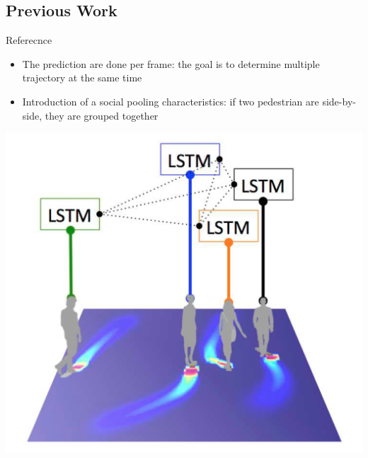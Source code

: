 \documentclass[a0,portrait]{a0poster}
\begin{document}
\begin{multicols}{2}
\section*{Previous Work}
Referecnce\\
\begin{minipage}[]{0.5\linewidth}
\begin{itemize}
\justifying
\item The prediction are done per frame: the goal is to determine multiple trajectory at the same time
\item Introduction of a social pooling characteristics: if two pedestrian are side-by-side, they are grouped together
\end{itemize}
\end{minipage}
\hfill
\begin{minipage}[]{0.5\linewidth}
\centerline {\includegraphics[scale = 0.35]{figure/socialLSTM}}
\end{minipage}
%

\end{multicols}
\end{document}
